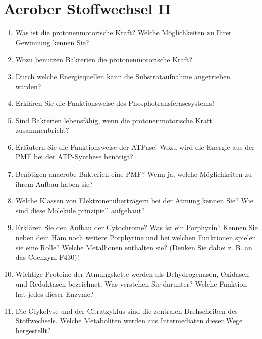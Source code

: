 
\section{Aerober Stoffwechsel II}
\begin{enumerate}
	\item Was ist die protonenmotorische Kraft? Welche Möglichkeiten zu Ihrer Gewinnung kennen Sie?
	\item Wozu benutzen Bakterien die protonenmotorische Kraft?
	\item Durch welche Energiequellen kann die Substrataufnahme angetrieben warden?
	\item Erklären Sie die Funktionsweise des Phosphotransferasesystems!
	\item Sind Bakterien lebensfähig, wenn die protonenmotorische Kraft zusammenbricht? 
	\item Erläutern Sie die Funktionsweise der  ATPase! Wozu wird die Energie aus der PMF bei der ATP-Synthese benötigt?
	\item Benötigen anaerobe Bakterien eine PMF? Wenn ja, welche Möglichkeiten zu ihrem Aufbau haben sie?
	\item Welche Klassen von Elektronenüberträgern bei der Atmung kennen Sie? Wie sind diese Moleküle prinzipiell aufgebaut?
	\item Erklären Sie  den Aufbau der Cytochrome? Was ist ein Porphyrin? Kennen Sie neben dem Häm noch weitere Porphyrine und bei  welchen Funktionen spielen sie eine Rolle? Welche Metallionen enthalten sie? (Denken Sie dabei z. B. an das  Coenzym F430)!
	\item Wichtige Proteine der Atmungskette werden als Dehydrogenasen, Oxidasen und Reduktasen bezeichnet. Was verstehen Sie darunter? Welche Funktion hat jedes dieser Enzyme?
	\item Die Glykolyse und der Citratzyklus sind die zentralen Drehscheiben des Stoffwechsels. Welche Metaboliten werden aus Intermediaten dieser Wege hergestellt?
\end{enumerate}

